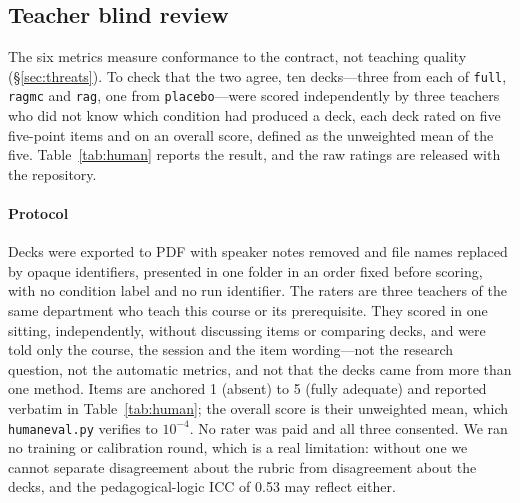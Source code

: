 \documentclass[review,12pt]{elsarticle}
\renewcommand{\_}{\kgunderscore\allowbreak}
\newcommand{\id}[1]{\texttt{#1}}
\begin{document}
\subsection{Teacher blind review}
\label{sec:human-review}

The six metrics measure conformance to the contract, not teaching quality
(\S\ref{sec:threats}). To check that the two agree, ten decks---three from each
of \id{full}, \id{rag\_mc} and \id{rag}, one from \id{placebo}---were scored
independently by three teachers who did not know which condition had produced a
deck, each deck rated on five five-point items and on an overall score, defined
as the unweighted mean of the five. Table~\ref{tab:human} reports the result,
and the raw ratings are released with the repository.

\paragraph{Protocol} Decks were exported to PDF with speaker notes removed and
file names replaced by opaque identifiers, presented in one folder in an order
fixed before scoring, with no condition label and no run identifier. The raters
are three teachers of the same department who teach this course or its
prerequisite. They scored in one sitting, independently, without discussing
items or comparing decks, and were told only the course, the session and the
item wording---not the research question, not the automatic metrics, and not
that the decks came from more than one method. Items are anchored 1 (absent) to
5 (fully adequate) and reported verbatim in Table~\ref{tab:human}; the overall
score is their unweighted mean, which \id{human\_eval.py} verifies to
$10^{-4}$. No rater was paid and all three consented. We ran no training or
calibration round, which is a real limitation: without one we cannot separate
disagreement about the rubric from disagreement about the decks, and the
pedagogical-logic ICC of 0.53 may reflect either.
\end{document}
